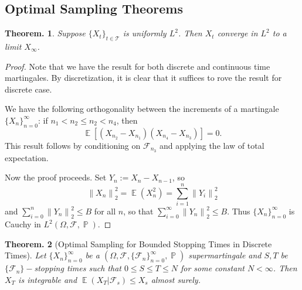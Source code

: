 \documentclass[11pt, a4paper]{memoir}
\newcommand{\norm}[1]{\ensuremath{\left\lVert#1\right\rVert}}
\theoremstyle{change}
\newtheorem{theorem}{Theorem.}[section]
\theoremstyle{plain}
\theoremstyle{nonumberplain}
\newtheorem{proof}{Proof}
\DeclareMathOperator{\pr}{{\mathbb{P}}}
\DeclareMathOperator{\E}{{\mathbb{E}}}
\numberwithin{equation}{section}
\begin{document}
\subsection{Optimal Sampling Theorems}
\begin{theorem}
    Suppose $\{X_t\}_{t\in\mathcal{T}}$ is uniformly $L^2$.
    Then $X_t$ converge in $L^2$ to a limit $X_\infty$.
\end{theorem}
\begin{proof}
    Note that we have the result for both discrete and continuous time martingales.
    By discretization, it is clear that it suffices to rove the result for discrete case.

    We have the following orthogonality between the increments of a martingale $\{X_n\}_{n=0}^\infty$: if $n_1<n_2\leq n_2<n_4$, then
    \begin{equation*}
        \E[(X_{n_2}-X_{n_1})(X_{n_4}-X_{n_3})]=0.
    \end{equation*}
    This result follows by conditioning on $\mathcal{F}_{n_3}$ and applying the law of total expectation.

    Now the proof proceeds.
    Set $Y_n:=X_n-X_{n-1}$, so
    \begin{equation*}
        \norm{X_n}_2^2=\E(X_n^2)=\sum_{i=1}^n\norm{Y_i}_2^2
    \end{equation*}
    and $\sum_{i=0}^n\norm{Y_n}_2^2\leq B$ for all $n$, so that $\sum_{i=0}^\infty\norm{Y_n}_2^2\leq B$.
    Thus $\{X_n\}_{n=0}^\infty$ is Cauchy in $L^2(\Omega,\mathcal{F},\pr)$.
\end{proof}
\begin{theorem}[Optimal Sampling for Bounded Stopping Times in Discrete Times]
    Let $\{X_n\}_{n=0}^\infty$ be a $(\Omega,\mathcal{F},\{\mathcal{F}_n\}_{n=0}^\infty,\pr)$ supermartingale and $S,T$ be $\{\mathcal{F}_n\}-$stopping times such that $0\leq S\leq T\leq N$ for some constant $N<\infty$.
    Then $X_T$ is integrable and $\E(X_T|\mathcal{F}_s)\leq X_s$ almost surely.
\end{theorem}
\end{document}
